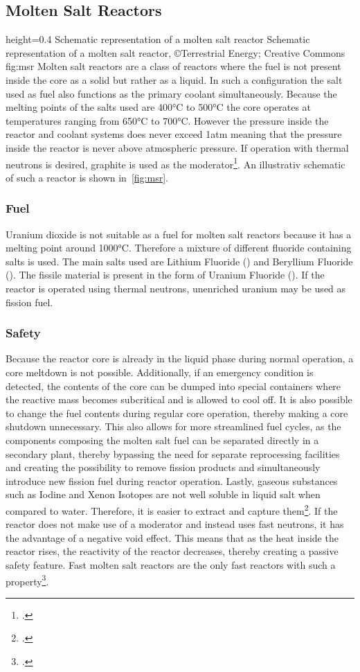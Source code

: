 \subsection{Molten Salt Reactors}
    {height=0.4\textheight}
    {Schematic representation of a molten salt reactor}
    {Schematic representation of a molten salt reactor, ©Terrestrial Energy; Creative Commons}
    {fig:msr}
Molten salt reactors are a class of reactors where the fuel is not present inside the core as a solid
but rather as a liquid. In such a configuration the salt used as fuel also functions as the primary coolant
simultaneously. Because the melting points of the salts used are 400°C to 500°C the core operates at temperatures
ranging from 650°C to 700°C. However the pressure inside the reactor and coolant systems does never
exceed 1atm meaning that the pressure inside the reactor is never above atmospheric pressure.
If operation with thermal neutrons is desired, graphite is used as the moderator\footcite[147-152]{T4Gen}.
An illustrativ schematic of such a reactor is shown in~\ref{fig:msr}.
\subsubsection{Fuel}
Uranium dioxide is not suitable as a fuel for molten salt reactors because it has a melting point around
1000°C. Therefore a mixture of different fluoride containing salts is used. The main salts used are
Lithium Fluoride () and Beryllium Fluoride (). The fissile material is present in the
form of Uranium Fluoride (). If the reactor is operated using thermal neutrons, unenriched
uranium may be used as fission fuel.
\subsubsection{Safety}
Because the reactor core is already in the liquid phase during normal operation, a core meltdown is not
possible. Additionally, if an emergency condition is detected, the contents of the core can be dumped
into special containers where the reactive mass becomes subcritical and is allowed to cool off.
It is also possible to change the fuel contents during regular core operation, thereby making a core
shutdown unnecessary. This also allows for more streamlined fuel cycles, as the components composing
the molten salt fuel can be separated directly in a secondary plant, thereby bypassing the need for
separate reprocessing facilities and creating the possibility to remove fission products and simultaneously
introduce new fission fuel during reactor operation. Lastly, gaseous substances such as Iodine
and Xenon Isotopes are not well soluble in liquid salt when compared to water. Therefore,
it is easier to extract and capture them\footcite{msrs}. If the reactor does not make use
of a moderator and instead uses fast neutrons, it has the advantage of a negative void effect. This
means that as the heat inside the reactor rises, the reactivity of the reactor decreases, thereby
creating a passive safety feature. Fast molten salt reactors are the only fast reactors with such a
property\footcite[164]{T4Gen}.
